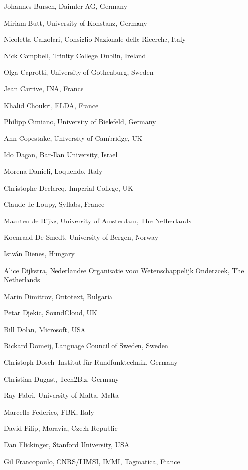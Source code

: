 \documentclass[10pt, plain]{../../metanetpaper}
\begin{document}
\begin{multicols}{3}
\begin{small}
\begin{enumerate}
{      \item Johannes Bursch, Daimler AG, Germany
      \item Miriam Butt, University of Konstanz, Germany
      \item Nicoletta Calzolari, Consiglio Nazionale delle Ricerche, Italy
      \item Nick Campbell, Trinity College Dublin, Ireland
      \item Olga Caprotti, University of Gothenburg, Sweden
      \item Jean Carrive, INA, France
      \item Khalid Choukri, ELDA, France
      \item Philipp Cimiano, University of Bielefeld, Germany
      \item Ann Copestake, University of Cambridge, UK
      \item Ido Dagan, Bar-Ilan University, Israel
      \item Morena Danieli, Loquendo, Italy
      \item Christophe Declercq, Imperial College, UK
      \item Claude de Loupy, Syllabs, France
      \item Maarten de Rijke, University of Amsterdam, The Netherlands
      \item Koenraad De Smedt, University of Bergen, Norway
      \item István Dienes, Hungary
      \item Alice Dijkstra, Nederlandse Organisatie voor Wetenschappelijk Onderzoek, The Netherlands
      \item Marin Dimitrov, Ontotext, Bulgaria
      \item Petar Djekic, SoundCloud, UK
      \item Bill Dolan, Microsoft, USA
      \item Rickard Domeij, Language Council of Sweden, Sweden
      \item Christoph Dosch, Institut für Rundfunktechnik, Germany
      \item Christian Dugast, Tech2Biz, Germany
      \item Ray Fabri, University of Malta, Malta
      \item Marcello Federico, FBK, Italy
      \item David Filip, Moravia, Czech Republic
      \item Dan Flickinger, Stanford University, USA
      \item Gil Francopoulo, CNRS/LIMSI, IMMI, Tagmatica, France
}
\end{enumerate}
\end{small}
\end{multicols}
\end{document}
